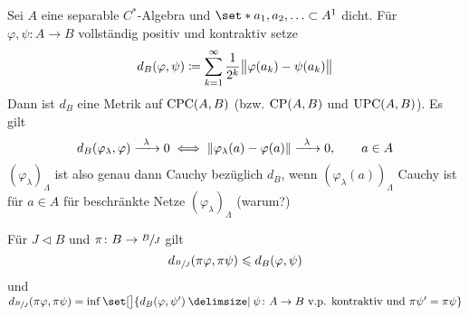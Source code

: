 Sei $A$ eine separable $C^*$-Algebra und $\set*{a_1, a_2, \ldots } \subset A^1$ dicht.
Für $\varphi,\psi \colon A \to B$ vollständig positiv und kontraktiv setze 
\[
	d_B(\varphi,\psi) \coloneqq \sum_{k=1}^{\infty} \frac{1}{2^k} \norm[\big]{\varphi(a_k) - \psi(a_k)}
\]
Dann ist $d_B$ eine Metrik auf $\CPC(A,B)$ (bzw. $\CP(A,B)$ und $\UPC(A,B)$).
Es gilt 
\[
	d_B(\varphi_\lambda,\varphi) \grenzw{\lambda} 0 \iff \norm*{\varphi_\lambda(a) - \varphi(a)} \grenzw{\lambda} 0, \qquad a \in A
\]
$(\varphi_\lambda)_\Lambda$ ist also genau dann Cauchy bezüglich $d_B$, wenn $(\varphi_\lambda(a))_\Lambda$ Cauchy ist für $a \in A$ für beschränkte Netze $(\varphi_\lambda)_\Lambda$ (warum?) 

\begin{proposition}[label=prop:42]
	Für $J \lhd B$ und $\pi \colon B \to \sfrac{B}{J}$ gilt
	\[
		d_{\sfrac{B}{J}} \enbrace*{\pi \varphi, \pi \psi} \le d_B(\varphi,\psi)
	\]
	und $d_{\sfrac{B}{J}} \enbrace*{\pi \varphi, \pi \psi} = \inf \set[\big]{d_B(\varphi,\psi') \given \psi \colon A \to B \text{ v.p. kontraktiv und } \pi \psi' = \pi \psi}$
\end{proposition}
